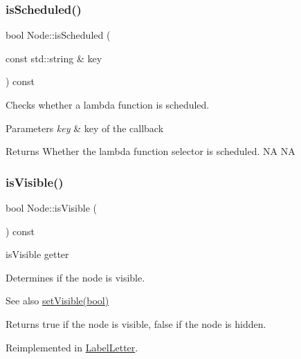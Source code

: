 \subsubsection{\texorpdfstring{is\+Scheduled()}{isScheduled()}\hspace{0.1cm}{\footnotesize\ttfamily [4/4]}}
{\footnotesize\ttfamily bool Node\+::is\+Scheduled (\begin{DoxyParamCaption}\item[{const std\+::string \&}]{key }\end{DoxyParamCaption}) const}

Checks whether a lambda function is scheduled.


\begin{DoxyParams}{Parameters}
{\em key} & key of the callback \\
\hline
\end{DoxyParams}
\begin{DoxyReturn}{Returns}
Whether the lambda function selector is scheduled.  NA  NA 
\end{DoxyReturn}
\mbox{\label{classNode_accff189524c62c6cb446cc19e3a79ab4}} 
\subsubsection{\texorpdfstring{is\+Visible()}{isVisible()}\hspace{0.1cm}{\footnotesize\ttfamily [1/2]}}
{\footnotesize\ttfamily bool Node\+::is\+Visible (\begin{DoxyParamCaption}{ }\end{DoxyParamCaption}) const\hspace{0.3cm}{\ttfamily [virtual]}}



is\+Visible getter 

Determines if the node is visible.

\begin{DoxySeeAlso}{See also}
{\ttfamily \hyperlink{classNode_ad8d9f6f838941a2a8ae18420757af158}{set\+Visible(bool)}}
\end{DoxySeeAlso}
\begin{DoxyReturn}{Returns}
true if the node is visible, false if the node is hidden. 
\end{DoxyReturn}


Reimplemented in \hyperlink{classLabelLetter_a9f7187e6902a7b2a80ac3d2c5fc10523}{Label\+Letter}.

